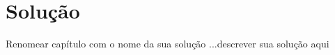 \chapter{Solução} \label{cha:solucao}
Renomear capítulo com o nome da sua solução
...descrever sua solução aqui